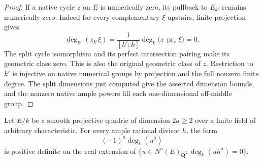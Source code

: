 \begin{proof}
If a native cycle $z$ on $E$ is numerically zero, its
pullback to $E_{k'}$ remains numerically zero. Indeed for
every complementary $\xi$ upstairs, finite projection gives
\[
 \deg_{k'}(z_{k'}\xi)
      =\frac1{[k':k]}\deg_k\bigl(z\,\operatorname{pr}_*\xi\bigr)=0.
\]
The split cycle isomorphism and its perfect intersection
pairing make its geometric class zero. This is also the
original geometric class of $z$. Restriction to $k'$ is
injective on native numerical groups by projection and
the full nonzero finite degree. The split dimensions just
computed give the asserted dimension bounds, and the
nonzero native ample powers fill each one-dimensional
off-middle group.
\end{proof}

\begin{lemma}
\label{r17c2:quadric-form}
Let $E/k$ be a smooth projective quadric of dimension
$2a\ge2$ over a finite field of arbitrary characteristic.
For every ample rational divisor $h$, the form
\[
                (-1)^a\deg_k(u^2)
\]
is positive definite on the real extension of
$\{u\in N^a(E)_{\mathbf Q}:\deg_k(u h^a)=0\}$.
\end{lemma}

